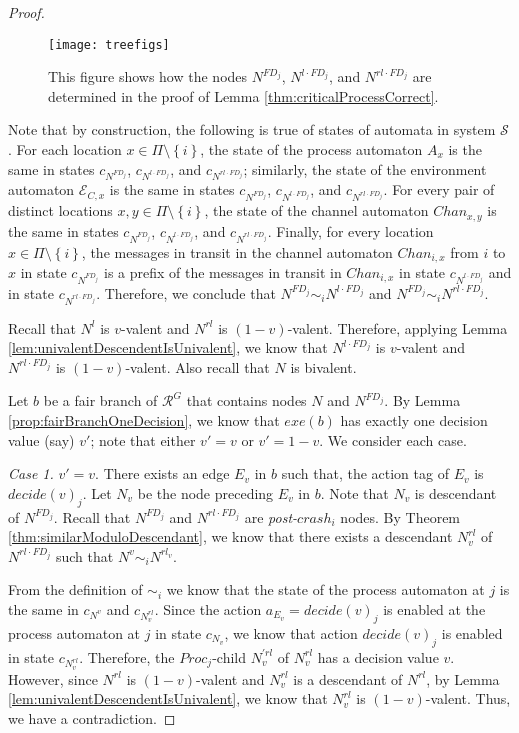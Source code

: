 \documentclass[11pt]{article}
\numberwithin{theorem}{section}
\newcommand{\set}[1]{\left\{#1\right\}}
\begin{document}
\begin{proof}
\begin{figure}[hptb]
 \centering
\texttt{[image: treefigs]}
 \caption{This figure shows how the nodes $N^{FD_j}$, $N^{l\cdot FD_j}$, and $N^{rl\cdot FD_j}$ are determined in the proof of Lemma \ref{thm:criticalProcessCorrect}.}
 \label{fig:extendPathsByFDEdges}
\end{figure}


Note that by construction, the following is true of states of automata in system $\mathcal{S}$. For each location $x \in \Pi \setminus \set{i}$, the state of the process automaton $A_x$ is the same in states $c_{N^{FD_j}}$, $c_{N^{l \cdot FD_j}}$, and $c_{N^{rl \cdot FD_j}}$; similarly, the state of the environment automaton $\mathcal{E}_{C,x}$ is the same in states $c_{N^{FD_j}}$, $c_{N^{l \cdot FD_j}}$, and $c_{N^{rl \cdot FD_j}}$. For every pair of distinct locations $x,y \in \Pi \setminus \set{i}$, the state of the channel automaton $Chan_{x,y}$ is the same in states $c_{N^{FD_j}}$, $c_{N^{l \cdot FD_j}}$, and $c_{N^{rl \cdot FD_j}}$. Finally, for every location $x \in \Pi \setminus \set{i}$, the messages in transit in the channel automaton $Chan_{i,x}$ from $i$ to $x$ in state $c_{N^{FD_j}}$ is a prefix of the messages in transit in $Chan_{i,x}$ in state $c_{N^{l \cdot FD_j}}$ and in state $c_{N^{rl \cdot FD_j}}$. Therefore, we conclude that $N^{FD_j} \sim_i N^{l \cdot FD_j}$ and $N^{FD_j} \sim_i N^{rl \cdot FD_j}$.

Recall that $N^l$ is $v$-valent and $N^{rl}$ is $(1-v)$-valent. Therefore, applying Lemma \ref{lem:univalentDescendentIsUnivalent}, we know that $N^{l\cdot FD_j}$ is $v$-valent and $N^{rl \cdot FD_j}$  is $(1-v)$-valent. Also recall that $N$ is bivalent. 

Let $b$ be a fair branch of $\mathcal{R}^G$ that contains nodes $N$ and $N^{FD_j}$. 
By Lemma \ref{prop:fairBranchOneDecision}, we know that $exe(b)$ has exactly one decision value (say) $v'$; note that either $v'=v$ or $v' = 1-v$. We consider each case.

\emph{Case 1.} $v'=v$. There exists an edge $E_v$ in $b$ such that, the action tag of $E_v$ is $decide(v)_j$. Let $N_v$ be the node preceding $E_v$ in $b$. Note that $N_v$ is descendant of $N^{FD_j}$. 
Recall that $N^{FD_j}$ and $N^{rl\cdot FD_j}$ are \emph{post-$crash_i$} nodes.
By Theorem \ref{thm:similarModuloDescendant}, we know that there exists a descendant $N^{rl}_{v}$ of $N^{rl\cdot FD_j}$ such that $N^v \sim_i N^{rl_v}$.

From the definition of $\sim_i$ we know that the state of the process automaton at $j$ is the same in $c_{N^v}$ and $c_{N^{rl}_{v}}$. Since the action $a_{E_v} = decide(v)_j$ is enabled at the process automaton at $j$ in state $c_{N_v}$, we know that action $decide(v)_j$ is enabled in state $c_{N^{rl}_{v}}$. Therefore, the $Proc_j$-child $N^{\prime rl}_{v}$ of $N^{rl}_{v}$ has a decision value $v$. However, since $N^{rl}$  is $(1-v)$-valent and $N^{rl}_{v}$ is a descendant of $N^{rl}$, by Lemma \ref{lem:univalentDescendentIsUnivalent}, we know that $N^{rl}_{v}$ is $(1-v)$-valent. Thus, we have a contradiction.


\end{proof}
\end{document}
